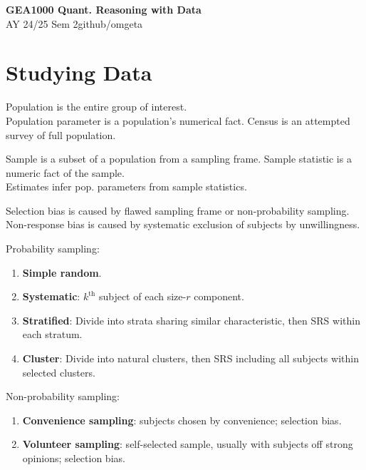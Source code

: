 \documentclass[12pt, a4paper]{article}
\newcommand{\mytitle}{GEA1000 Quant. Reasoning with Data}
\newcommand{\myauthor}{github/omgeta}
\newcommand{\mydate}{AY 24/25 Sem 2}
\begin{document}
\raggedright
\footnotesize
\begin{multicols*}{3}
\setlength{\premulticols}{1pt}
\setlength{\postmulticols}{1pt}
\setlength{\multicolsep}{1pt}
\setlength{\columnsep}{2pt}

{\normalsize{\textbf{\mytitle}}} \\
{\footnotesize{\mydate\hspace{2pt}\textemdash\hspace{2pt}\myauthor}}\vspace{-1pt}
\section{Studying Data}
Population is the entire group of interest.\\ Population parameter is a population's numerical fact. Census is an attempted survey of full population.

Sample is a subset of a population from a sampling frame. Sample statistic is a numeric fact of the sample. \\Estimates infer pop. parameters from sample statistics. 

Selection bias is caused by flawed sampling frame or non-probability sampling. Non-response bias is caused by systematic exclusion of subjects by unwillingness.

Probability sampling:
\begin{enumerate}[\roman*.]
  \item \textbf{Simple random}.
  \item \textbf{Systematic}: $k^{\text{th}}$ subject of each size-$r$ component.
  \item \textbf{Stratified}: Divide into strata sharing similar characteristic, then SRS within each stratum. 
  \item \textbf{Cluster}: Divide into natural clusters, then SRS including all subjects within selected clusters.
\end{enumerate}

Non-probability sampling:
\begin{enumerate}[\roman*.]
  \item \textbf{Convenience sampling}: subjects chosen by convenience; selection bias.
  \item \textbf{Volunteer sampling}: self-selected sample, usually with subjects off strong opinions; selection bias.
\end{enumerate}


\end{multicols*}
\end{document}
